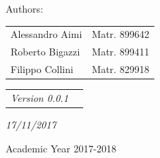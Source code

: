 \documentclass[a4paper,12pt,twoside]{report}
\begin{document}
\begin{center}
\begin{center}
\vspace{10mm}
Authors:
\vspace{-3mm}
\end{center}
\begin{center}
\begin{tabular}{l l }
Alessandro Aimi & Matr. 899642 \\
Roberto Bigazzi & Matr. 899411 \\
Filippo Collini & Matr. 829918
\end{tabular}
\end{center}
\vspace{10mm}

\begin{center}
\begin{tabular}{l l }
\it{Version 0.0.1} \\
\end{tabular}
\end{center}
\begin{center}
\vspace{-4mm}
\it{17/11/2017}
\end{center}
\vspace{-4mm}
{\large{Academic Year 2017-2018}}
\end{center}

\end{document}
